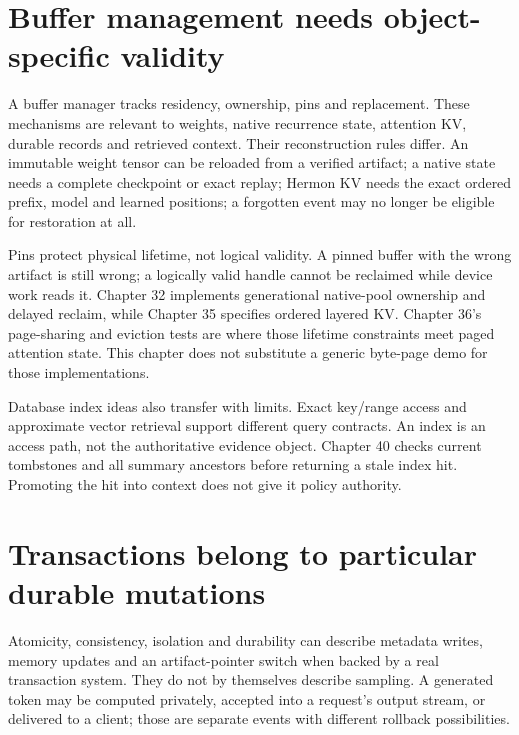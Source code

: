 \section{Buffer management needs object-specific validity}
\label{evod42:buffers}
A buffer manager tracks residency, ownership, pins and replacement. These
mechanisms are relevant to weights, native recurrence state, attention KV,
durable records and retrieved context. Their reconstruction rules differ.
An immutable weight tensor can be reloaded from a verified artifact; a native
state needs a complete checkpoint or exact replay; Hermon KV needs the exact
ordered prefix, model and learned positions; a forgotten event may no longer
be eligible for restoration at all.


Pins protect physical lifetime, not logical validity. A pinned buffer with the
wrong artifact is still wrong; a logically valid handle cannot be reclaimed
while device work reads it. Chapter 32 implements generational native-pool
ownership and delayed reclaim, while Chapter 35 specifies ordered layered KV.
Chapter 36's page-sharing and eviction tests are where those lifetime constraints
meet paged attention state. This chapter does not substitute
a generic byte-page demo for those implementations.

Database index ideas also transfer with limits. Exact key/range access and
approximate vector retrieval support different query contracts. An index is
an access path, not the authoritative evidence object. Chapter 40 checks current
tombstones and all summary ancestors before returning a stale index hit.
Promoting the hit into context does not give it policy authority.

\section{Transactions belong to particular durable mutations}
\label{evod42:transactions}
Atomicity, consistency, isolation and durability can describe metadata writes,
memory updates and an artifact-pointer switch when backed by a real
transaction system. They do not by themselves describe sampling. A generated
token may be computed privately, accepted into a request's output stream, or
delivered to a client; those are separate events with different rollback
possibilities.

